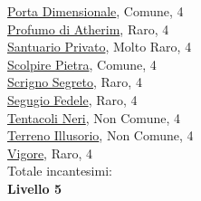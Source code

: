 \begin{multicols}{3}
{{\hyperlink{Porta Dimensionale}{Porta Dimensionale}, Comune, 4\\
\hyperlink{Profumo di Atherim}{Profumo di Atherim}, Raro, 4\\
\hyperlink{Santuario Privato}{Santuario Privato}, Molto Raro, 4\\
\hyperlink{Scolpire Pietra}{Scolpire Pietra}, Comune, 4\\
\hyperlink{Scrigno Segreto}{Scrigno Segreto}, Raro, 4\\
\hyperlink{Segugio Fedele}{Segugio Fedele}, Raro, 4\\
\hyperlink{Tentacoli Neri}{Tentacoli Neri}, Non Comune, 4\\
\hyperlink{Terreno Illusorio}{Terreno Illusorio}, Non Comune, 4\\
\hyperlink{Vigore}{Vigore}, Raro, 4\\

\medskip Totale incantesimi: \theinclvquattro\\

\textbf{Livello 5} 

}}
\end{multicols}

